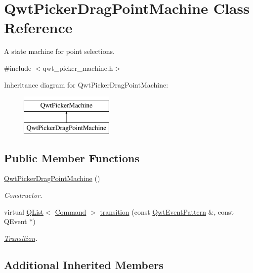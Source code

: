 \hypertarget{class_qwt_picker_drag_point_machine}{\section{Qwt\-Picker\-Drag\-Point\-Machine Class Reference}
\label{class_qwt_picker_drag_point_machine}
}


A state machine for point selections.  




{\ttfamily \#include $<$qwt\-\_\-picker\-\_\-machine.\-h$>$}

Inheritance diagram for Qwt\-Picker\-Drag\-Point\-Machine\-:\begin{figure}[H]
\begin{center}
\leavevmode
\includegraphics[height=2.000000cm]{class_qwt_picker_drag_point_machine}
\end{center}
\end{figure}
\subsection*{Public Member Functions}
\begin{DoxyCompactItemize}
\item 
\hyperlink{class_qwt_picker_drag_point_machine_af534289d12a39eeb9b52402b61967fac}{Qwt\-Picker\-Drag\-Point\-Machine} ()
\begin{DoxyCompactList}\small\item\em Constructor. \end{DoxyCompactList}\item 
virtual \hyperlink{class_q_list}{Q\-List}$<$ \hyperlink{class_qwt_picker_machine_a3a8d3d4c107ce5f8351e4cbdd38c43f7}{Command} $>$ \hyperlink{class_qwt_picker_drag_point_machine_aa9e5fc73a7e828ecb1feb1305bdedc36}{transition} (const \hyperlink{class_qwt_event_pattern}{Qwt\-Event\-Pattern} \&, const Q\-Event $\ast$)
\begin{DoxyCompactList}\small\item\em \hyperlink{class_transition}{Transition}. \end{DoxyCompactList}\end{DoxyCompactItemize}
\subsection*{Additional Inherited Members}


